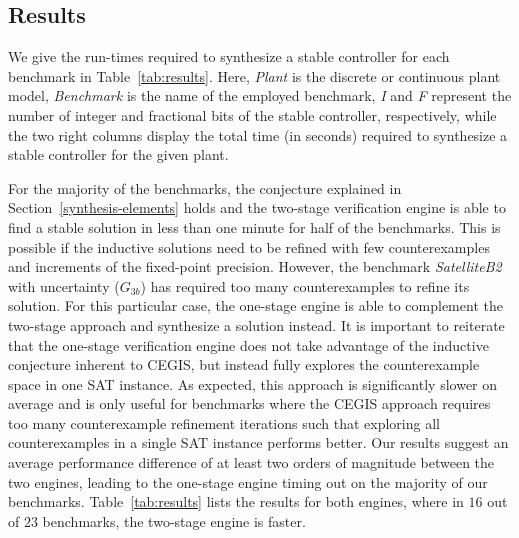 \documentclass[final]{sig-alternate-05-2015}
\begin{document}
\subsection{Results}
\label{experimental-results}

We give the run-times required to synthesize a stable controller for each
benchmark in Table~\ref{tab:results}.  Here, \textit{Plant} is the discrete
or continuous plant model, \textit{Benchmark} is the name of the employed
benchmark, \textit{I} and \textit{F} represent the number of integer and
fractional bits of the stable controller, respectively, 
while the two right columns display the total time (in seconds) required to synthesize a stable controller
for the given plant. 

For the majority of the benchmarks, the conjecture explained in
Section~\ref{synthesis-elements} holds and the two-stage verification 
engine is able to find a stable solution in less than one minute for half
of the benchmarks. This is possible if the inductive solutions need to be 
refined with few counterexamples and increments of the fixed-point precision.  
However, the benchmark \emph{SatelliteB2} with uncertainty ($G_{3b}$) has 
required too many counterexamples to refine its solution.  
For this particular case, the one-stage engine is able to complement the
two-stage approach and synthesize a solution instead.  It is important to
reiterate that the one-stage verification engine does not take advantage of
the inductive conjecture inherent to CEGIS, but instead fully explores the
counterexample space in one SAT instance.  As expected, this approach is 
significantly slower on average and is only useful for benchmarks where 
the CEGIS approach requires too many counterexample refinement iterations
such that exploring all counterexamples in a single SAT instance performs better.
Our results suggest an average performance difference of at least two orders
of magnitude between the two engines, leading to the one-stage engine timing
out on the majority of our benchmarks.  Table~\ref{tab:results}
lists the results for both engines, where in $16$ out of $23$
benchmarks, the two-stage engine is faster.
\end{document}
